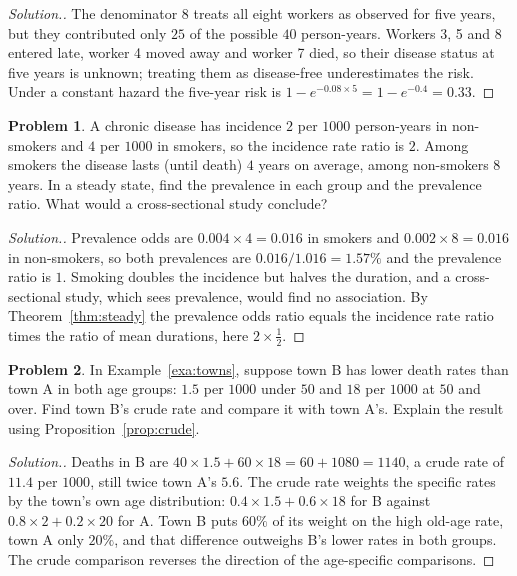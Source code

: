 \documentclass[11pt,a4paper]{article}
\numberwithin{equation}{section}
\theoremstyle{definition}
\newtheorem{problemx}{Problem}[subsection]
\newenvironment{problem}{\begin{problemx}}{\end{problemx}}
\newenvironment{solution}
  {\renewcommand{\qedsymbol}{}\begin{proof}[\textit{Solution}.]}
  {\end{proof}}
\begin{document}
\begin{solution}
The denominator $8$ treats all eight workers as observed for five years, but they contributed only $25$ of the possible $40$ person-years.
Workers 3, 5 and 8 entered late, worker 4 moved away and worker 7 died, so their disease status at five years is unknown; treating them
as disease-free underestimates the risk. Under a constant hazard the five-year risk is $1 - e^{-0.08 \times 5} = 1 - e^{-0.4} = 0.33$.
\end{solution}

\begin{problem}
\label{prob:prevbias}
A chronic disease has incidence $2$ per $1000$ person-years in non-smokers and $4$ per $1000$ in smokers, so the incidence rate ratio is $2$.
Among smokers the disease lasts (until death) $4$ years on average, among non-smokers $8$ years. In a steady state, find the prevalence in each
group and the prevalence ratio. What would a cross-sectional study conclude?
\end{problem}

\begin{solution}
Prevalence odds are $0.004 \times 4 = 0.016$ in smokers and $0.002 \times 8 = 0.016$ in non-smokers, so both prevalences are $0.016/1.016 = 1.57\%$ and
the prevalence ratio is $1$. Smoking doubles the incidence but halves the duration, and a cross-sectional study, which sees prevalence,
would find no association. By Theorem~\ref{thm:steady} the prevalence odds ratio equals the incidence rate ratio times the ratio of mean
durations, here $2 \times \tfrac12$.
\end{solution}

\begin{problem}
In Example~\ref{exa:towns}, suppose town B has lower death rates than town A in both age groups: $1.5$ per $1000$ under $50$ and $18$ per $1000$ at
$50$ and over. Find town B's crude rate and compare it with town A's. Explain the result using Proposition~\ref{prop:crude}.
\end{problem}

\begin{solution}
Deaths in B are $40 \times 1.5 + 60 \times 18 = 60 + 1080 = 1140$, a crude rate of $11.4$ per $1000$, still twice town A's $5.6$. The crude rate weights the
specific rates by the town's own age distribution: $0.4 \times 1.5 + 0.6 \times 18$ for B against $0.8 \times 2 + 0.2 \times 20$ for A. Town B puts $60\%$ of its
weight on the high old-age rate, town A only $20\%$, and that difference outweighs B's lower rates in both groups. The crude comparison
reverses the direction of the age-specific comparisons.
\end{solution}
\end{document}
